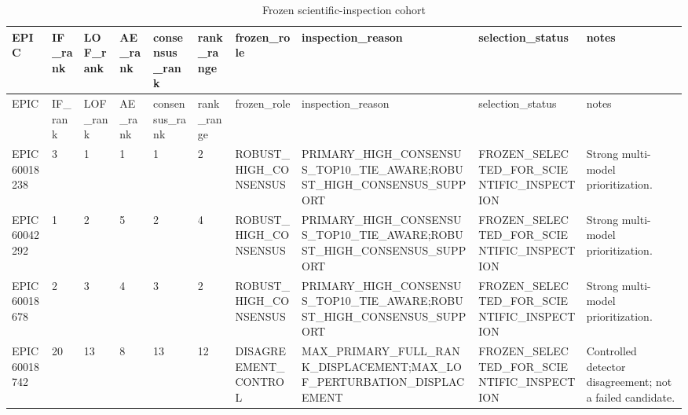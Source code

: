 \begin{longtable}{llllllllll}
\caption{Frozen scientific-inspection cohort}\\
\toprule
EPIC & IF\_rank & LOF\_rank & AE\_rank & consensus\_rank & rank\_range & frozen\_role & inspection\_reason & selection\_status & notes \\
\midrule
\endfirsthead
\toprule
EPIC & IF\_rank & LOF\_rank & AE\_rank & consensus\_rank & rank\_range & frozen\_role & inspection\_reason & selection\_status & notes \\
\midrule
\endhead
EPIC 60018238 & 3 & 1 & 1 & 1 & 2 & ROBUST\_HIGH\_CONSENSUS & PRIMARY\_HIGH\_CONSENSUS\_TOP10\_TIE\_AWARE;ROBUST\_HIGH\_CONSENSUS\_SUPPORT & FROZEN\_SELECTED\_FOR\_SCIENTIFIC\_INSPECTION & Strong multi-model prioritization. \\
EPIC 60042292 & 1 & 2 & 5 & 2 & 4 & ROBUST\_HIGH\_CONSENSUS & PRIMARY\_HIGH\_CONSENSUS\_TOP10\_TIE\_AWARE;ROBUST\_HIGH\_CONSENSUS\_SUPPORT & FROZEN\_SELECTED\_FOR\_SCIENTIFIC\_INSPECTION & Strong multi-model prioritization. \\
EPIC 60018678 & 2 & 3 & 4 & 3 & 2 & ROBUST\_HIGH\_CONSENSUS & PRIMARY\_HIGH\_CONSENSUS\_TOP10\_TIE\_AWARE;ROBUST\_HIGH\_CONSENSUS\_SUPPORT & FROZEN\_SELECTED\_FOR\_SCIENTIFIC\_INSPECTION & Strong multi-model prioritization. \\
EPIC 60018742 & 20 & 13 & 8 & 13 & 12 & DISAGREEMENT\_CONTROL & MAX\_PRIMARY\_FULL\_RANK\_DISPLACEMENT;MAX\_LOF\_PERTURBATION\_DISPLACEMENT & FROZEN\_SELECTED\_FOR\_SCIENTIFIC\_INSPECTION & Controlled detector disagreement; not a failed candidate. \\
\bottomrule
\end{longtable}
